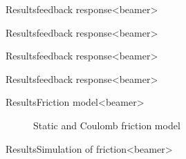 \begin{frame}{Results}{feedback response}<beamer>

\begin{figure}
\centering

\end{figure}
\end{frame}

\begin{frame}{Results}{feedback response}<beamer>

\begin{figure}
\centering

\end{figure}
\end{frame}

\begin{frame}{Results}{feedback response}<beamer>

\begin{figure}
\centering

\end{figure}
\end{frame}

\begin{frame}{Results}{feedback response}<beamer>

\begin{figure}
\centering

\end{figure}
\end{frame}

\begin{frame}{Results}{Friction model}<beamer>

\begin{figure}[h]
\centering
\caption{Static and Coulomb friction model}
\label{fig:new_friction_model}
\end{figure}
\end{frame}


\begin{frame}{Results}{Simulation of friction}<beamer>
\begin{figure}
\centering

\end{figure}
\end{frame}


